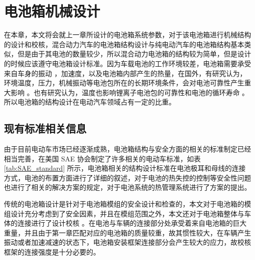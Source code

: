 
\chapter{电池箱机械设计}
\label{chap:engineering}

在本章，本文将会就上一章所设计的电池箱系统参数，对于该电池箱进行机械结构的设计和校核，混合动力汽车的电池箱结构设计与纯电动汽车的电池箱结构基本类似，但是由于其电池的数量较少，所以混合动力电池箱的结构较为简单，但是设计的时候应该遵守电池箱设计标准。因为车载电池的工作环境较差，电池箱需要承受来自车身的振动 ，加速度，以及电池箱内部产生的热量，在国外，有研究认为，环境温度，压力，机械振动等电池包所在的长期环境条件，会对电池可靠性产生重大影响 \cite{王文伟2016电动汽车电池箱结构随机振动疲劳分析}。也有研究认为，温度也影响锂离子电池包的可靠性和电池的循环寿命 \cite{能量效率和工作温度对锂离子电池剩余寿命的影响}。所以电池箱的结构设计在电动汽车领域占有一定的比重。

\section{现有标准相关信息}

由于目前电动车市场已经逐渐成熟，电池箱结构与安全方面的相关的标准制定已经相当完善，在美国 SAE 协会制定了许多相关的电动车标准，如表 \ref{tab:SAE_standard} 所示，电池箱相关的结构设计标准在电池极耳和母线的连接方式，电池的布置方面进行了详细的叙述，对于电池的热失控的控制等安全性问题也进行了相关的解决方案的规定，对于电池系统的热管理系统进行了方案的提出。

传统的电池箱设计是针对于电池箱模组的安全设计和检查的，本文对于电池箱的模组设计充分考虑到了安全因素，并且在模组范围之外，本文还对于电池箱整体与车体的连接进行了设计校核 \cite{Dubarry2009From}。在电池与车辆的连接部分处承受着来自电池箱的巨大重量，并且由于第一章匹配对应的电池箱的质量较重，故其惯性较大，在车辆产生振动或者加速减速的状态下，电池箱安装框架连接部分会产生较大的应力，故校核框架的连接强度是十分必要的。

